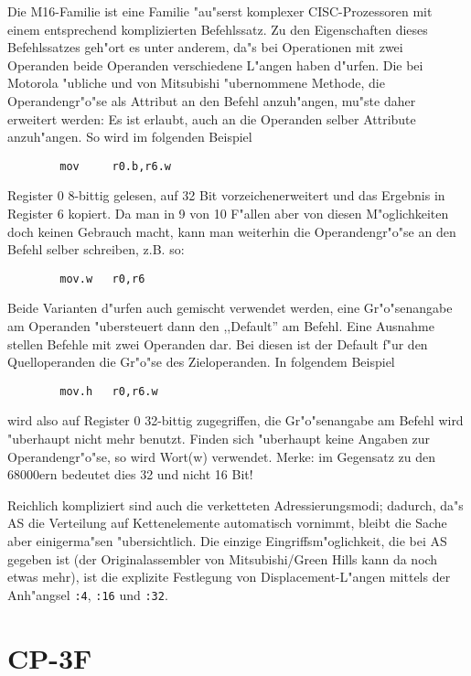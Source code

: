 \documentclass[12pt,a4paper,twoside]{report}
\newcommand{\tty}[1]{{\tt #1}}
\begin{document}
Die M16-Familie ist eine Familie "au"serst komplexer CISC-Prozessoren
mit einem entsprechend komplizierten Befehlssatz.  Zu den Eigenschaften
dieses Befehlssatzes geh"ort es unter anderem, da"s bei Operationen
mit zwei Operanden beide Operanden verschiedene L"angen haben d"urfen.
Die bei Motorola "ubliche und von Mitsubishi "ubernommene Methode, die
Operandengr"o"se als Attribut an den Befehl anzuh"angen, mu"ste daher
erweitert werden: Es ist erlaubt, auch an die Operanden selber Attribute
anzuh"angen.  So wird im folgenden Beispiel
\begin{verbatim}
        mov     r0.b,r6.w
\end{verbatim}
Register 0 8-bittig gelesen, auf 32 Bit vorzeichenerweitert und das
Ergebnis in Register 6 kopiert.  Da man in 9 von 10 F"allen aber von
diesen M"oglichkeiten doch keinen Gebrauch macht, kann man weiterhin
die Operandengr"o"se an den Befehl selber schreiben, z.B. so:
\begin{verbatim}
        mov.w   r0,r6
\end{verbatim}
Beide Varianten d"urfen auch gemischt verwendet werden, eine
Gr"o"senangabe am Operanden "ubersteuert dann den ,,Default'' am Befehl.
Eine Ausnahme stellen Befehle mit zwei Operanden dar.   Bei diesen ist
der Default f"ur den Quelloperanden die Gr"o"se des Zieloperanden. In
folgendem Beispiel
\begin{verbatim}
        mov.h   r0,r6.w
\end{verbatim}
wird also auf Register 0 32-bittig zugegriffen, die Gr"o"senangabe
am Befehl wird "uberhaupt nicht mehr benutzt.  Finden sich "uberhaupt
keine Angaben zur Operandengr"o"se, so wird Wort(w) verwendet.  Merke:
im Gegensatz zu den 68000ern bedeutet dies 32 und nicht 16 Bit!
\par
Reichlich kompliziert sind auch die verketteten Adressierungsmodi;
dadurch, da"s AS die Verteilung auf Kettenelemente automatisch
vornimmt, bleibt die Sache aber einigerma"sen "ubersichtlich.  Die
einzige Eingriffsm"oglichkeit, die bei AS gegeben ist (der Originalassembler
von Mitsubishi/Green Hills kann da noch etwas mehr), ist die explizite
Festlegung von Displacement-L"angen mittels der Anh"angsel \tty{:4},
\tty{:16} und \tty{:32}.


\section{CP-3F}
\end{document}
